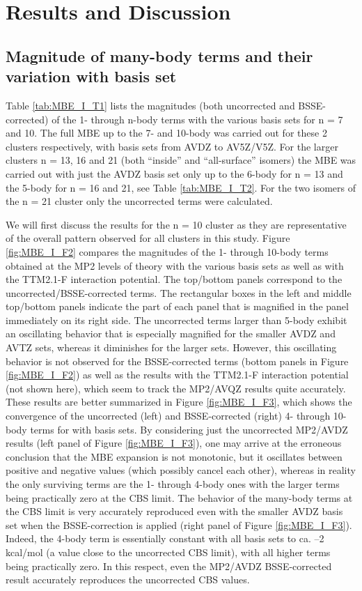 \documentclass[11pt, proquest]{uwthesis}[2020/02/24]
\let\ce\ch
\begin{document}
\section{Results and Discussion}
\subsection{Magnitude of many-body terms and their variation with basis set}

\par Table \ref{tab:MBE_I_T1} lists the magnitudes (both uncorrected and BSSE-corrected) of the 1- through n-body terms with the various basis sets for n = 7 and 10. The full MBE up to the 7- and 10-body was carried out for these 2 clusters respectively, with basis sets from AVDZ to AV5Z/V5Z. For the larger clusters n = 13, 16 and 21 (both “inside” and “all-surface” isomers) the MBE was carried out with just the AVDZ basis set only up to the 6-body for n = 13 and the 5-body for n = 16 and 21, see Table \ref{tab:MBE_I_T2}. For the two isomers of the n = 21 cluster only the uncorrected terms were calculated.

\par We will first discuss the results for the n = 10 cluster as they are representative of the overall pattern observed for all clusters in this study. Figure \ref{fig:MBE_I_F2} compares the magnitudes of the 1- through 10-body terms obtained at the MP2 levels of theory with the various basis sets as well as with the TTM2.1-F interaction potential. The top/bottom panels correspond to the uncorrected/BSSE-corrected terms. The rectangular boxes in the left and middle top/bottom panels indicate the part of each panel that is magnified in the panel immediately on its right side. The uncorrected terms larger than 5-body exhibit an oscillating behavior that is especially magnified for the smaller AVDZ and AVTZ sets, whereas it diminishes for the larger sets. However, this oscillating behavior is not observed for the BSSE-corrected terms (bottom panels in Figure \ref{fig:MBE_I_F2}) as well as the results with the TTM2.1-F interaction potential (not shown here), which seem to track the MP2/AVQZ results quite accurately. These results are better summarized in Figure \ref{fig:MBE_I_F3}, which shows the convergence of the uncorrected (left) and BSSE-corrected (right) 4- through 10-body terms for \ce{(H2O)_{10}} with basis sets. By considering just the uncorrected MP2/AVDZ results (left panel of Figure \ref{fig:MBE_I_F3}), one may arrive at the erroneous conclusion that the MBE expansion is not monotonic, but it oscillates between positive and negative values (which possibly cancel each other), whereas in reality the only surviving terms are the 1- through 4-body ones with the larger terms being practically zero at the CBS limit. The behavior of the many-body terms at the CBS limit is very accurately reproduced even with the smaller AVDZ basis set when the BSSE-correction is applied (right panel of Figure \ref{fig:MBE_I_F3}). Indeed, the 4-body term is essentially constant with all basis sets to ca. –2 kcal/mol (a value close to the uncorrected CBS limit), with all higher terms being practically zero. In this respect, even the MP2/AVDZ BSSE-corrected result accurately reproduces the uncorrected CBS values.
\end{document}
